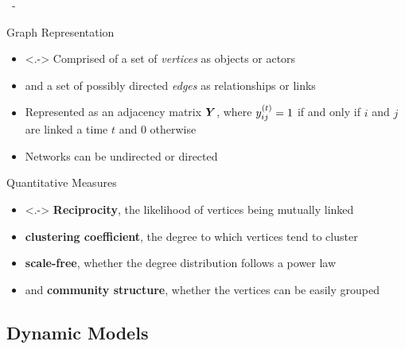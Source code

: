 \documentclass{beamer}
\newenvironment{xframe}
    {\begin{frame}{
        \ifx\insertsubsection\empty
            \strut
        \else\ifx\insertsubsubsection\empty
            \insertsection
        \else
            \insertsection~-~\insertsubsection
        \fi\fi
    }{
        \ifx\insertsubsection\empty
            \insertsection
        \else\ifx\insertsubsubsection\empty
            \insertsubsection
        \else
            \insertsubsubsection
        \fi\fi
    }}
    {\end{frame}}
\newenvironment{xblock}[1]
    {\begin{block}{#1}}
    {\end{block}}
\begin{document}
    \begin{xframe}
        \begin{xblock}{Graph Representation}
            \begin{itemize}
                \item<.-> Comprised of a set of \emph{vertices} as objects or actors
                \item and a set of possibly directed \emph{edges} as relationships or links
                \item Represented as an adjacency matrix $\bm{Y}$, where $\sub(y)^\t=1$ if and only if $i$ and $j$ are linked a time $t$ and 0 otherwise
                \item Networks can be undirected or directed
            \end{itemize}
        \end{xblock}
        
        \begin{xblock}{Quantitative Measures}
            \begin{itemize}
                \item<.-> \textbf{Reciprocity}, the likelihood of vertices being mutually linked
                \item \textbf{clustering coefficient}, the degree to which vertices tend to cluster
                \item \textbf{scale-free}, whether the degree distribution follows a power law
                \item and \textbf{community structure}, whether the vertices can be easily grouped
            \end{itemize}
        \end{xblock}
    \end{xframe}
    
    \subsection{Dynamic Models}
    
\end{document}

